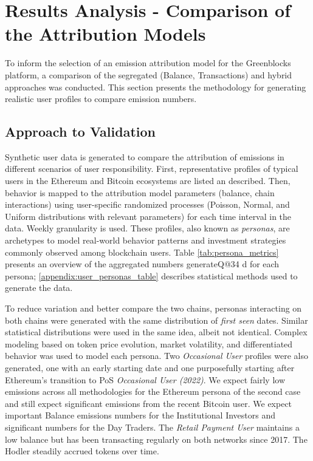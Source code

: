 \documentclass[11pt]{report}
\begin{document}
\section{Results Analysis - Comparison of the Attribution Models \label{sec:results_analysis}}

To inform the selection of an emission attribution model for the Greenblocks platform, a comparison of the segregated (Balance, Transactions) and hybrid approaches was conducted. This section presents the methodology for generating realistic user profiles to compare emission numbers.

\subsection{Approach to Validation \label{sec:approach_validation}}

Synthetic user data is generated to compare the attribution of emissions in different scenarios of user responsibility. First, representative profiles of typical users in the Ethereum and Bitcoin ecosystems are listed an described. Then, behavior is mapped to the attribution model parameters (balance, chain interactions) using user-specific randomized processes (Poisson, Normal, and Uniform distributions with relevant parameters) for each time interval in the data. Weekly granularity is used. These profiles, also known as \textit{personas}, are archetypes to model real-world behavior patterns and investment strategies commonly observed among blockchain users. Table \ref{tab:persona_metrics} presents an overview of the aggregated numbers generateQ@34
d for each persona; \ref{appendix:user_personas_table} describes statistical methods used to generate the data.






To reduce variation and better compare the two chains, personas interacting on both chains were generated with the same distribution of \textit{first seen} dates. Similar statistical distributions were used in the same idea, albeit not identical. Complex modeling based on token price evolution, market volatility, and differentiated behavior was used to model each persona. Two \textit{Occasional User} profiles were also generated, one with an early starting date and one purposefully starting after Ethereum's transition to PoS \textit{Occasional User (2022)}. We expect fairly low emissions across all methodologies for the Ethereum persona of the second case and still expect significant emissions from the recent Bitcoin user. We expect important Balance emissions numbers for the Institutional Investors and significant numbers for the Day Traders. The \textit{Retail Payment User} maintains a low balance but has been transacting regularly on both networks since 2017. The Hodler steadily accrued tokens over time.
\end{document}
